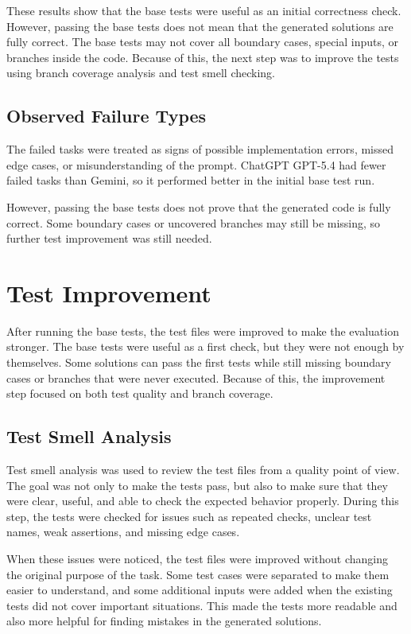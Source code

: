 \documentclass[journal]{IEEEtran}
\begin{document}
These results show that the base tests were useful as an initial correctness check. However, passing the base tests does not mean that the generated solutions are fully correct. The base tests may not cover all boundary cases, special inputs, or branches inside the code. Because of this, the next step was to improve the tests using branch coverage analysis and test smell checking.

\subsection{Observed Failure Types}

The failed tasks were treated as signs of possible implementation errors, missed edge cases, or misunderstanding of the prompt. ChatGPT GPT-5.4 had fewer failed tasks than Gemini, so it performed better in the initial base test run.

However, passing the base tests does not prove that the generated code is fully correct. Some boundary cases or uncovered branches may still be missing, so further test improvement was still needed.

\section{Test Improvement}

After running the base tests, the test files were improved to make the evaluation stronger. The base tests were useful as a first check, but they were not enough by themselves. Some solutions can pass the first tests while still missing boundary cases or branches that were never executed. Because of this, the improvement step focused on both test quality and branch coverage.

\subsection{Test Smell Analysis}

Test smell analysis was used to review the test files from a quality point of view. The goal was not only to make the tests pass, but also to make sure that they were clear, useful, and able to check the expected behavior properly. During this step, the tests were checked for issues such as repeated checks, unclear test names, weak assertions, and missing edge cases.

When these issues were noticed, the test files were improved without changing the original purpose of the task. Some test cases were separated to make them easier to understand, and some additional inputs were added when the existing tests did not cover important situations. This made the tests more readable and also more helpful for finding mistakes in the generated solutions.
\end{document}

